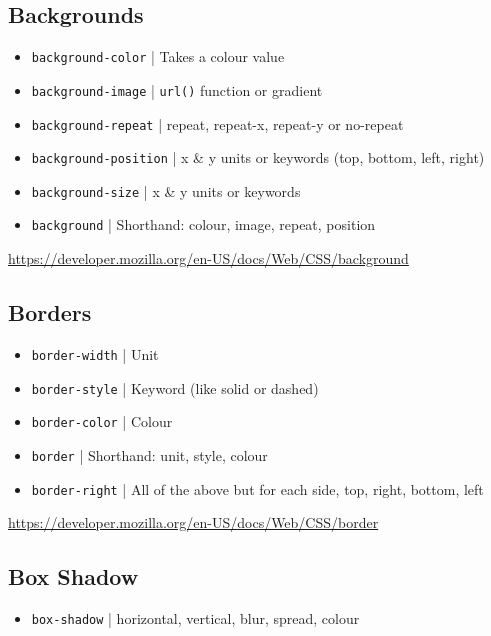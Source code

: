 \subsection{Backgrounds}

\begin{itemize}
    \item \texttt{background-color} | Takes a colour value
    \item \texttt{background-image} | \texttt{url()} function or gradient
    \item \texttt{background-repeat} | repeat, repeat-x, repeat-y or no-repeat
    \item \texttt{background-position} | x \& y units or keywords (top, bottom, left, right)
    \item \texttt{background-size} | x \& y units or keywords
    \item \texttt{background} | Shorthand: colour, image, repeat, position
\end{itemize}

\href{Backgrounds on MDN}{https://developer.mozilla.org/en-US/docs/Web/CSS/background}

\subsection{Borders}

\begin{itemize}
    \item \texttt{border-width} | Unit
    \item \texttt{border-style} | Keyword (like solid or dashed)
    \item \texttt{border-color} | Colour
    \item \texttt{border} | Shorthand: unit, style, colour
    \item \texttt{border-right} | All of the above but for each side, top, right, bottom, left
\end{itemize}

\href{Borders on MDN}{https://developer.mozilla.org/en-US/docs/Web/CSS/border}

\subsection{Box Shadow}

\begin{itemize}
    \item \texttt{box-shadow} | horizontal, vertical, blur, spread, colour
\end{itemize}

